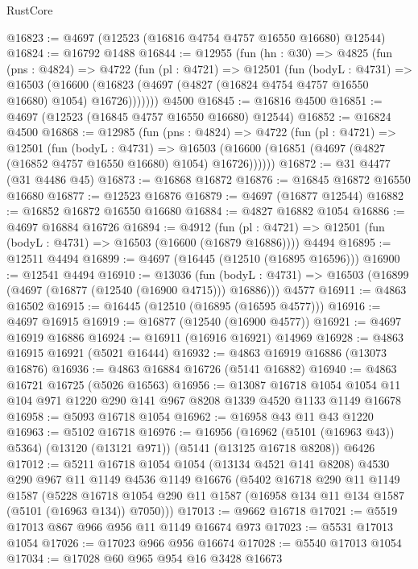 \begin{lexlean}{RustCore}
\begin{coremodule}
@16823 := @4697 (@12523 (@16816 @4754 @4757 @16550 @16680) @12544)
@16824 := @16792 @1488
@16844 := @12955
    (fun (hn : @30) =>
    @4825
      (fun (pns : @4824) =>
      @4722
        (fun (pl : @4721) =>
        @12501
          (fun (bodyL : @4731) =>
          @16503
            (@16600 (@16823 (@4697 (@4827 (@16824 @4754 @4757 @16550 @16680) @1054) @16726)))))))
    @4500
@16845 := @16816 @4500
@16851 := @4697 (@12523 (@16845 @4757 @16550 @16680) @12544)
@16852 := @16824 @4500
@16868 := @12985
    (fun (pns : @4824) =>
    @4722
      (fun (pl : @4721) =>
      @12501
        (fun (bodyL : @4731) =>
        @16503 (@16600 (@16851 (@4697 (@4827 (@16852 @4757 @16550 @16680) @1054) @16726))))))
@16872 := @31 @4477 (@31 @4486 @45)
@16873 := @16868 @16872
@16876 := @16845 @16872 @16550 @16680
@16877 := @12523 @16876
@16879 := @4697 (@16877 @12544)
@16882 := @16852 @16872 @16550 @16680
@16884 := @4827 @16882 @1054
@16886 := @4697 @16884 @16726
@16894 := @4912
    (fun (pl : @4721) => @12501 (fun (bodyL : @4731) => @16503 (@16600 (@16879 @16886))))
    @4494
@16895 := @12511 @4494
@16899 := @4697 (@16445 (@12510 (@16895 @16596)))
@16900 := @12541 @4494
@16910 := @13036
    (fun (bodyL : @4731) => @16503 (@16899 (@4697 (@16877 (@12540 (@16900 @4715))) @16886)))
    @4577
@16911 := @4863 @16502
@16915 := @16445 (@12510 (@16895 (@16595 @4577)))
@16916 := @4697 @16915
@16919 := @16877 (@12540 (@16900 @4577))
@16921 := @4697 @16919 @16886
@16924 := @16911 (@16916 @16921) @14969
@16928 := @4863 @16915 @16921 (@5021 @16444)
@16932 := @4863 @16919 @16886 (@13073 @16876)
@16936 := @4863 @16884 @16726 (@5141 @16882)
@16940 := @4863 @16721 @16725 (@5026 @16563)
@16956 := @13087
    @16718
    @1054
    @1054
    @11
    @104
    @971
    @1220
    @290
    @141
    @967
    @8208
    @1339
    @4520
    @1133
    @1149
    @16678
@16958 := @5093 @16718 @1054
@16962 := @16958 @43 @11 @43 @1220
@16963 := @5102 @16718
@16976 := @16956
    (@16962 (@5101 (@16963 @43)) @5364)
    (@13120 (@13121 @971))
    (@5141 (@13125 @16718 @8208))
    @6426
@17012 := @5211
    @16718
    @1054
    @1054
    (@13134 @4521 @141 @8208)
    @4530
    @290
    @967
    @11
    @1149
    @4536
    @1149
    @16676
    (@5402
      @16718
      @290
      @11
      @1149
      @1587
      (@5228 @16718 @1054 @290 @11 @1587 (@16958 @134 @11 @134 @1587 (@5101 (@16963 @134)) @7050)))
@17013 := @9662 @16718
@17021 := @5519 @17013 @867 @966 @956 @11 @1149 @16674 @973
@17023 := @5531 @17013 @1054
@17026 := @17023 @966 @956 @16674
@17028 := @5540 @17013 @1054
@17034 := @17028 @60 @965 @954 @16 @3428 @16673

\end{coremodule}
\end{lexlean}
